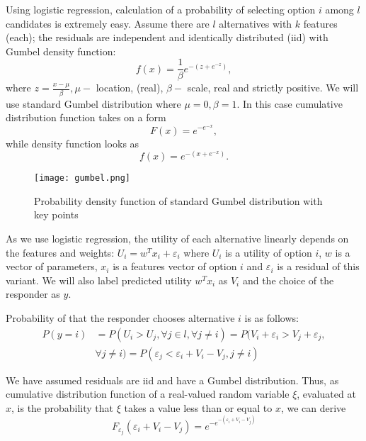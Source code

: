 \documentclass[a4paper, 12pt]{extreport}
\begin{document}
Using logistic regression, calculation of a probability of selecting option $i$ among $l$ candidates is extremely easy. Assume there are $l$ alternatives with $k$ features (each); the residuals are
independent and identically distributed (iid) with Gumbel density function:
\begin{equation}
	f(x) = \frac{1}{\beta}e^{-(z + e^{-z})},
\end{equation}
where $z = \frac{x - \mu}{\beta}, \mu -$ location, (real), $\beta -$ scale,
real and strictly positive.
We will use standard Gumbel distribution where $\mu = 0, \beta = 1$. In this case cumulative distribution function takes on a form
\begin{equation}
	F(x) = e^{-e^{-x}},
\end{equation}
while density function looks as
\begin{equation}
	f(x) = e^{-(x + e^{-x})}.
\end{equation}

\begin{figure}
  \texttt{[image: gumbel.png]}
  \caption{Probability density function of standard Gumbel distribution with key points}
\end{figure}

As we use logistic regression, the utility of each alternative linearly depends on the features and weights: $U_i = w^T x_i + \varepsilon_i$ where
$U_i$ is a utility of option $i$, $w$ is a vector of parameters, $x_i$ is a features vector of option $i$ and $\varepsilon_i$ is a residual of this variant. We will also label
predicted utility $w^T x_i$ as $V_i$ and the choice of the responder as $y$.

Probability of that the responder chooses alternative $i$ is as follows:
\begin{align}
	P(y = i) &= P(U_i > U_j, \forall j \in l, \forall j \neq i) = P(V_i + \varepsilon_i > V_j + \varepsilon_j, \nonumber \\
	&\forall j \neq i) = P(\varepsilon_j < \varepsilon_i + V_i - V_j, j \neq i)
\end{align}

We have assumed residuals are iid and have a Gumbel distribution. Thus, as cumulative distribution function of a real-valued random variable $\xi$, evaluated at $x$, is the probability
that $\xi$ takes a value less than or equal to $x$, we can derive
\begin{equation}
	F_{\varepsilon_j}(\varepsilon_i + V_i - V_j) = e^{-e^{-(\varepsilon_i + V_i - V_j)}}
\end{equation}
\end{document}
